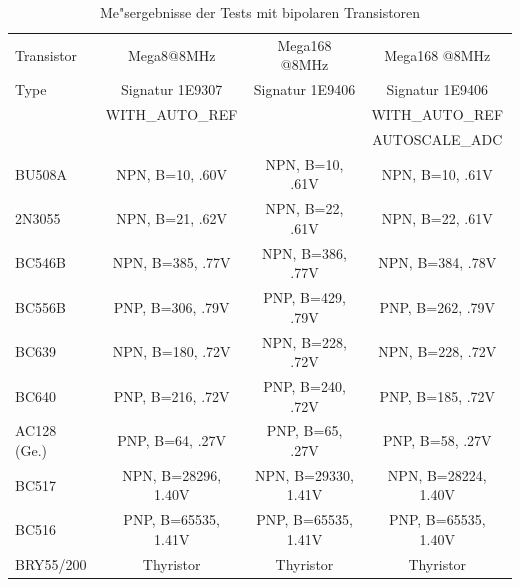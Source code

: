 \begin{table}[H]
  \begin{center}
    \begin{tabular}{| l | c | c | c |}
    \hline
     Transistor & Mega8@8MHz   & Mega168 @8MHz   & Mega168 @8MHz \\
     Type    & Signatur 1E9307 & Signatur 1E9406 & Signatur 1E9406 \\
             & WITH\_AUTO\_REF &                 & WITH\_AUTO\_REF \\
             &                 &                 & AUTOSCALE\_ADC \\
    \hline
    \hline
BU508A & NPN, B=10, .60V & NPN, B=10, .61V & NPN, B=10, .61V\\
    \hline
2N3055 & NPN, B=21, .62V & NPN, B=22, .61V & NPN, B=22, .61V\\
    \hline
BC546B & NPN, B=385, .77V & NPN, B=386, .77V & NPN, B=384, .78V\\
    \hline
BC556B & PNP, B=306, .79V & PNP, B=429, .79V & PNP, B=262, .79V\\
    \hline
BC639 & NPN, B=180, .72V & NPN, B=228, .72V & NPN, B=228, .72V\\

    \hline
BC640 & PNP, B=216, .72V & PNP, B=240, .72V & PNP, B=185, .72V\\
    \hline
AC128 (Ge.) & PNP, B=64, .27V & PNP, B=65, .27V & PNP, B=58, .27V\\
    \hline
BC517 & NPN, B=28296, 1.40V & NPN, B=29330, 1.41V & NPN, B=28224, 1.40V\\
    \hline
BC516 & PNP, B=65535, 1.41V & PNP, B=65535, 1.41V & PNP, B=65535, 1.40V\\
    \hline
BRY55/200 & Thyristor & Thyristor & Thyristor\\
    \hline
    \end{tabular}
  \end{center}
  \caption{Me"sergebnisse der Tests mit bipolaren Transistoren}
  \label{tab:bipolar} 
\end{table}


